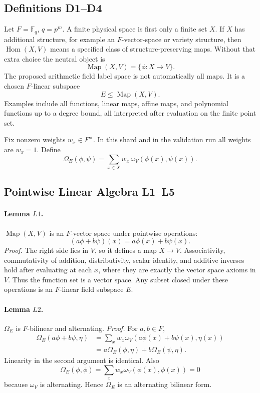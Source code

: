 \subsection{Definitions D1--D4}

Let \(F=\mathbb F_q\), \(q=p^m\).  A finite physical space is first only a
finite set \(X\).  If \(X\) has additional structure, for example an
\(F\)-vector-space or variety structure, then \(\operatorname{Hom}(X,V)\)
means a specified class of structure-preserving maps.  Without that extra
choice the neutral object is
\[
  \operatorname{Map}(X,V)=\{\phi:X\to V\}.
\]
The proposed arithmetic field label space is not automatically all maps.  It
is a chosen \(F\)-linear subspace
\[
  E\leq \operatorname{Map}(X,V).
\]
Examples include all functions, linear maps, affine maps, and polynomial
functions up to a degree bound, all interpreted after evaluation on the finite
point set.

Fix nonzero weights \(w_x\in F^\times\).  In this shard and in the validation
run all weights are \(w_x=1\).  Define
\[
  \Omega_E(\phi,\psi)
  =
  \sum_{x\in X}w_x\,\omega_V(\phi(x),\psi(x)).
\]

\subsection{Pointwise Linear Algebra L1--L5}

\paragraph{Lemma \(L1\).}
\(\operatorname{Map}(X,V)\) is an \(F\)-vector space under pointwise operations:
\[
  (a\phi+b\psi)(x)=a\phi(x)+b\psi(x).
\]
\emph{Proof.}
The right side lies in \(V\), so it defines a map \(X\to V\).  Associativity,
commutativity of addition, distributivity, scalar identity, and additive
inverses hold after evaluating at each \(x\), where they are exactly the vector
space axioms in \(V\).  Thus the function set is a vector space.  Any subset
closed under these operations is an \(F\)-linear field subspace \(E\).

\paragraph{Lemma \(L2\).}
\(\Omega_E\) is \(F\)-bilinear and alternating.
\emph{Proof.}
For \(a,b\in F\),
\[
\begin{aligned}
\Omega_E(a\phi+b\psi,\eta)
&=\sum_xw_x\omega_V(a\phi(x)+b\psi(x),\eta(x))\\
&=a\Omega_E(\phi,\eta)+b\Omega_E(\psi,\eta).
\end{aligned}
\]
Linearity in the second argument is identical.  Also
\[
  \Omega_E(\phi,\phi)=\sum_xw_x\omega_V(\phi(x),\phi(x))=0
\]
because \(\omega_V\) is alternating.  Hence \(\Omega_E\) is an alternating
bilinear form.

